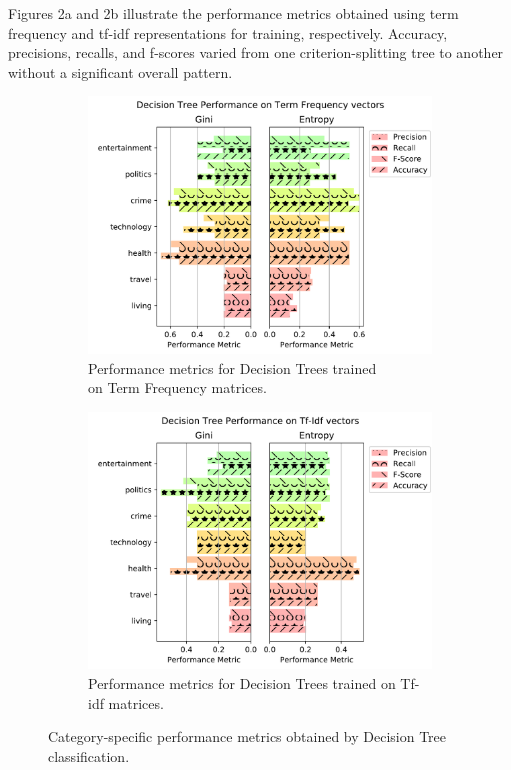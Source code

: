 \documentclass[11pt]{article}
\begin{document}
Figures 2a and 2b illustrate the performance metrics obtained using term frequency and tf-idf representations for training, respectively.
Accuracy, precisions, recalls, and f-scores varied from one criterion-splitting tree to another without a significant overall pattern.

\begin{figure}[h!] \label{fig:perftf_decisiontree}
	\centering
	\begin{subfigure}{.5\textwidth}
	  \centering
	  \includegraphics[width=\linewidth]{figures/decision_tree/tf_prec_n_rec}
	  \caption{Performance metrics for Decision Trees trained \\
	  on Term Frequency matrices.}
	  \label{fig:sub1}
	\end{subfigure}%
	\begin{subfigure}{.5\textwidth}
	  \centering
	  \includegraphics[width=\linewidth]{figures/decision_tree/tfidf_prec_n_rec}
	  \caption{Performance metrics for Decision Trees trained on Tf-idf matrices.}
	  \label{fig:sub2}
	\end{subfigure}
	\caption{Category-specific performance metrics obtained by Decision Tree classification.}
\end{figure}
\end{document}
